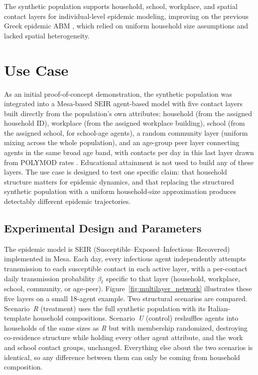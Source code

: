 \documentclass{article}
\begin{document}
The synthetic population supports household, school, workplace, and spatial contact layers for individual-level epidemic modeling, improving on the previous Greek epidemic ABM \citep{thomopoulos2024agent}, which relied on uniform household size assumptions and lacked spatial heterogeneity.

\section{Use Case}\label{applications-use-case}

As an initial proof-of-concept demonstration, the synthetic population was integrated into a Mesa-based SEIR agent-based model with five contact layers built directly from the population's own attributes: household (from the assigned household ID), workplace (from the assigned workplace building), school (from the assigned school, for school-age agents), a random community layer (uniform mixing across the whole population), and an age-group peer layer connecting agents in the same broad age band, with contacts per day in this last layer drawn from POLYMOD rates \citep{mossong2008social}. Educational attainment is not used to build any of these layers. The use case is designed to test one specific claim: that household structure matters for epidemic dynamics, and that replacing the structured synthetic population with a uniform household-size approximation produces detectably different epidemic trajectories.

\subsection{Experimental Design and Parameters}\label{experimental-design-parameters}

The epidemic model is SEIR (Susceptible--Exposed--Infectious--Recovered) implemented in Mesa.
Each day, every infectious agent independently attempts transmission to each susceptible contact in each active layer, with a per-contact daily transmission probability $\beta_\ell$ specific to that layer (household, workplace, school, community, or age-peer). Figure~\ref{fig:multilayer_network} illustrates these five layers on a small 18-agent example.
Two structural scenarios are compared. Scenario~\textit{R} (treatment) uses the full synthetic population with its Italian-template household compositions. Scenario~\textit{U} (control) reshuffles agents into households of the same sizes as \textit{R} but with membership randomized, destroying co-residence structure while holding every other agent attribute, and the work and school contact groups, unchanged. Everything else about the two scenarios is identical, so any difference between them can only be coming from household composition.
\end{document}
